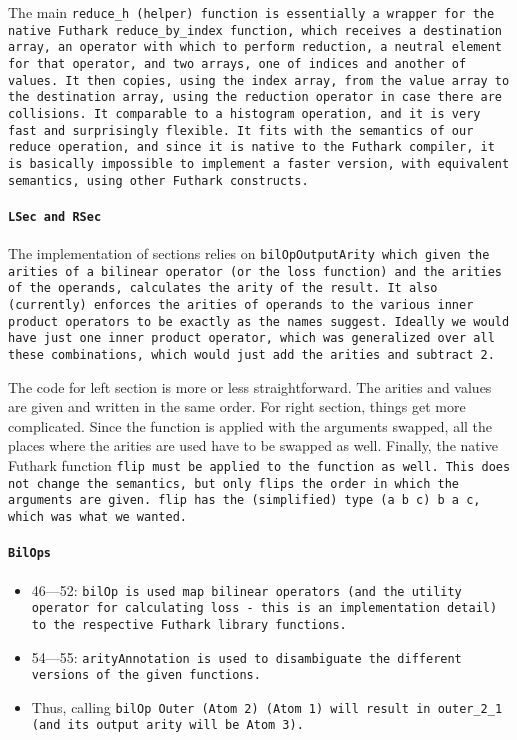 The main \tt{reduce\_h} (helper) function is essentially a wrapper for the
native Futhark \tt{reduce\_by\_index} function, which receives a
destination array, an operator with which to perform reduction, a neutral
element for that operator, and two arrays, one of indices and another of
values. It then copies, using the index array, from the value array to the
destination array, using the reduction operator in case there are collisions.
It comparable to a histogram operation, and it is very fast and surprisingly
flexible. It fits with the semantics of our reduce operation, and since it is
native to the Futhark compiler, it is basically impossible to implement
a faster version, with equivalent semantics, using other Futhark
constructs.

\paragraph{\tt{LSec} and \tt{RSec}}
The implementation of sections relies on \tt{bilOpOutputArity} which given the
arities of a bilinear operator (or the loss function) and the arities of the
operands, calculates the arity of the result. It also (currently) enforces
the arities of operands to the various inner product operators to be exactly
as the names suggest. Ideally we would have just one inner product operator,
which was generalized over all these combinations, which would just add the
arities and subtract \tt{2}.

The code for left section is more or less straightforward. The arities and
values are given and written in the same order. For right section, things
get more complicated. Since the function is applied with the arguments
swapped, all the places where the arities are used have to be swapped as
well. Finally, the native Futhark function \tt{flip} must be applied to
the function as well. This does not change the semantics, but only flips the
order in which the arguments are given. \tt{flip} has the (simplified) type \texttt{(a \rightarrow b \rightarrow c) \rightarrow b \rightarrow a \rightarrow c}, which was what we wanted.

\paragraph{\tt{BilOp}s}


\begin{itemize}
	\item 46---52: \tt{bilOp} is used map bilinear operators (and the utility
	operator for calculating loss - this is an implementation detail) to the
	respective Futhark library functions.
	\item 54---55: \tt{arityAnnotation} is used to disambiguate the different
	versions of the given functions.
	\item Thus, calling \tt{bilOp Outer (Atom 2) (Atom 1)} will result in
	\tt{outer\_2\_1} (and its output arity will be \tt{Atom 3}).
\end{itemize}

